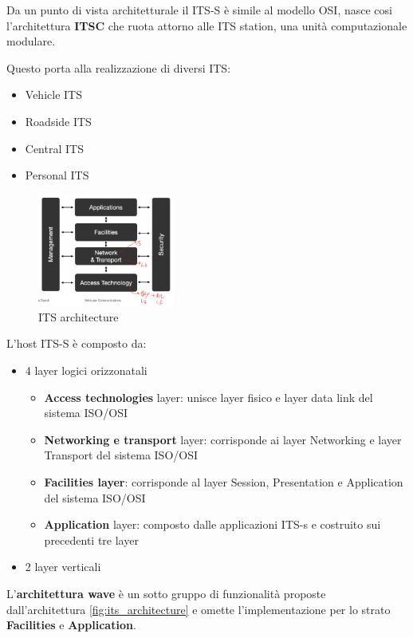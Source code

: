 Da un punto di vista architetturale il ITS-S è simile al modello OSI, nasce cosi l'architettura \textbf{ITSC} che ruota attorno alle ITS station, una unità computazionale modulare.

Questo porta alla realizzazione di diversi ITS:
\begin{itemize}
  \item Vehicle ITS
  \item Roadside ITS
  \item Central ITS
  \item Personal ITS
\end{itemize}


\begin{figure}[!ht]
  \centering
  \includegraphics[width=0.4\textwidth]{./images/its_architecture.png}
  \caption{ITS architecture}
  \label{fig:its_architecture}
\end{figure}


L'host ITS-S è composto da:
\begin{itemize}
  \item 4 layer logici orizzonatali
  \begin{itemize}
    \item \textbf{Access technologies} layer: unisce layer fisico e layer data link del sistema ISO/OSI
    \item \textbf{Networking e transport} layer: corrisponde ai layer Networking e layer Transport del sistema ISO/OSI 
    \item \textbf{Facilities layer}: corrisponde al layer Session, Presentation e Application del sistema ISO/OSI
    \item \textbf{Application} layer: composto dalle applicazioni ITS-s e costruito sui precedenti tre layer
  \end{itemize}
  \item 2 layer verticali
\end{itemize}


L'\textbf{architettura wave} è un sotto gruppo di funzionalità proposte dall'architettura \autoref{fig:its_architecture} e omette l'implementazione per lo strato \textbf{Facilities} e \textbf{Application}.

